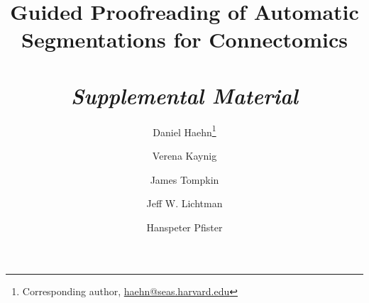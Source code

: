 \documentclass[10pt,twocolumn,letterpaper]{article}
\begin{document}
\title{Guided Proofreading of Automatic Segmentations for Connectomics\\~\\\textit{Supplemental Material}}

\author[1,2]{Daniel Haehn\thanks{Corresponding author,  \url{haehn@seas.harvard.edu}}}
\author[1,2]{Verena Kaynig}
\author[3]{James Tompkin}
\author[2]{Jeff W. Lichtman}
\author[1,2]{Hanspeter Pfister}


\maketitle








\newpage
{\small


}
\end{document}
